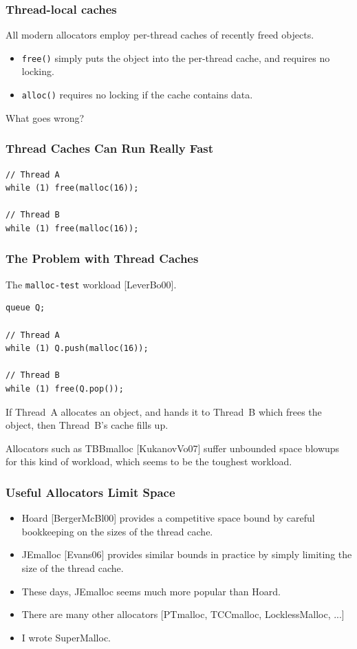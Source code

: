 \documentclass[xcolor=dvipsnames,14pt]{beamer}
\begin{document}
\begin{frame}
\frametitle{Thread-local caches}

All modern allocators employ per-thread caches of recently freed objects.

\begin{itemize}
\item \texttt{free()} simply puts the object into the
  per-thread cache, and requires no locking.
\item \texttt{alloc()} requires no locking if the cache contains data.
\end{itemize}

What goes wrong?
\end{frame}

\begin{frame}[fragile]
\frametitle{Thread Caches Can Run Really Fast}

\begin{verbatim}
// Thread A
while (1) free(malloc(16));

// Thread B
while (1) free(malloc(16));
\end{verbatim}
\end{frame}

\begin{frame}[fragile]
\frametitle{The Problem with Thread Caches}

The \texttt{malloc-test} workload [LeverBo00].

\begin{verbatim}
queue Q;

// Thread A
while (1) Q.push(malloc(16));

// Thread B
while (1) free(Q.pop());
\end{verbatim}


If Thread~A allocates an object, and hands it to Thread~B which frees
the object, then Thread~B's cache fills up.

Allocators such as TBBmalloc [KukanovVo07] suffer unbounded space
blowups for this kind of workload, which seems to be the toughest workload.
\end{frame}

\begin{frame}
\frametitle{Useful Allocators Limit Space}

\begin{itemize}
\item Hoard [BergerMcBl00] provides a competitive space bound by careful
bookkeeping on the sizes of the thread cache.

\item JEmalloc [Evans06] provides similar bounds in practice by simply
limiting the size of the thread cache.

\item These days, JEmalloc seems much more popular than Hoard.

\item There are many other allocators [PTmalloc, TCCmalloc, LocklessMalloc, ...]

\item I wrote SuperMalloc.
\end{itemize}

\end{frame}
\end{document}
